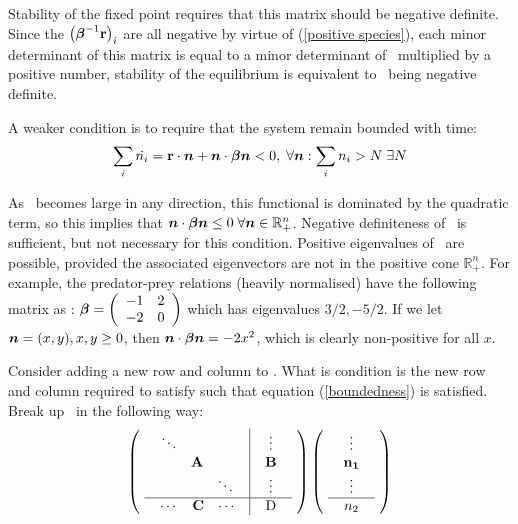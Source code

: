 \documentclass{article}
\newcommand{\br}{\mbox{${\bf r}$}} %
\newcommand{\bbeta}{\mbox{\boldmath{$\beta$}}}   %
\newcommand{\bn}{\mbox{\boldmath{$n$}}}          %
\providecommand{\reals}{\mathbb{R}}
\begin{document}
Stability of the fixed point requires that this matrix should be
negative definite. Since the $\left(\bbeta^{-1}\br\right)_i$ are
all negative by virtue of (\ref{positive species}), each minor
determinant of this matrix is equal to a minor determinant of \bbeta\
multiplied by a positive number, stability of the equilibrium is
equivalent to \bbeta\ being negative definite.

A weaker condition is to require that the system remain bounded with
time:
\begin{equation}\label{boundedness}
\sum_i\dot{n_i}=\br\cdot\bn + \bn\cdot\bbeta\bn < 0, \;\forall \bn:
\sum_in_i>N \;\exists N
\end{equation}

As \bn\ becomes large in any direction, this functional is dominated
by the quadratic term, so this implies that  $\bn\cdot\bbeta\bn\leq0
\; \forall\bn\in\reals^n_+$. Negative definiteness of \bbeta\ is sufficient,
but not necessary for this condition. Positive eigenvalues of \bbeta\
are possible, provided the associated eigenvectors are not in the
positive cone $\reals^n_+$. For example, the predator-prey
relations (heavily normalised) have the following matrix as \bbeta:
\begin{math}
\bbeta=\left(\begin{array}{cc}
-1 & 2\\
-2 & 0\\
\end{array}\right)
\end{math}
which has eigenvalues $3/2, -5/2$. If we let $\bn=(x,y), x,y\geq0$, then
$\bn\cdot\bbeta\bn=-2x^2$, which is clearly non-positive
for all $x$.

Consider adding a new row and column to \bbeta. What is condition is
the new row and column required to satisfy such that equation
(\ref{boundedness}) is satisfied. Break up \bbeta\ in the following
way:
\begin{displaymath}
\left(
  \mbox{
     \begin{tabular}{c|c}
       $\begin{array}{ccc}\ddots\\&{\bf A}\\&&\ddots\end{array}$ & 
       $\begin{array}{c}\vdots\\{\bf B}\\\vdots\end{array}$ \\
       \hline
       $\begin{array}{ccc}\cdots&{\bf C}&\cdots\end{array}$ & D
     \end{tabular}
   }
\right)
\left(
  \mbox{
     \begin{tabular}{c}
     $\begin{array}{c}\vdots\\{\bf n_1}\\\vdots\end{array}$\\
     \hline
     $n_2$
     \end{tabular}
    }
\right)
\end{displaymath}
\end{document}
